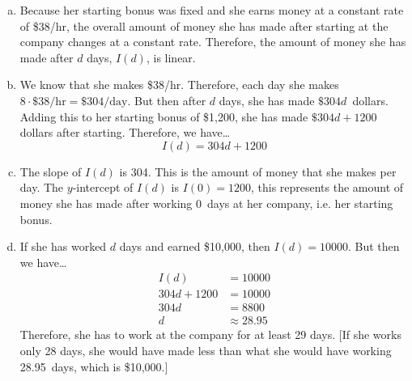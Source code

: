 \documentclass[11pt,letterpaper]{article}
\begin{document}
\sol
\begin{enumerate}[(a)]
\item Because her starting bonus was fixed and she earns money at a constant rate of \$38/hr, the overall amount of money she has made after starting at the company changes at a constant rate. Therefore, the amount of money she has made after $d$ days, $I(d)$, is linear. \pspace

\item We know that she makes \$38/hr. Therefore, each day she makes $8 \cdot \$38\text{/hr}= \$304\text{/day}$. But then after $d$ days, she has made $\$304d$~dollars. Adding this to her starting bonus of \$1,200, she has made $\$304d + 1200$ dollars after starting. Therefore, we have\dots
	\[
	I(d)= 304d + 1200
	\]

\item The slope of $I(d)$ is 304. This is the amount of money that she makes per day. The $y$-intercept of $I(d)$ is $I(0)= 1200$, this represents the amount of money she has made after working 0~days at her company, i.e. her starting bonus. \pspace

\item If she has worked $d$ days and earned \$10,000, then $I(d)= 10000$. But then we have\dots
	\[
	\begin{aligned}
	I(d)&= 10000 \\[0.3cm]
	304d + 1200&= 10000 \\[0.3cm]
	304d&= 8800 \\[0.3cm]
	d&\approx 28.95
	\end{aligned}
	\]
Therefore, she has to work at the company for at least 29 days. [If she works only 28 days, she would have made less than what she would have working 28.95~days, which is \$10,000.]
\end{enumerate}



\newpage
\end{document}

